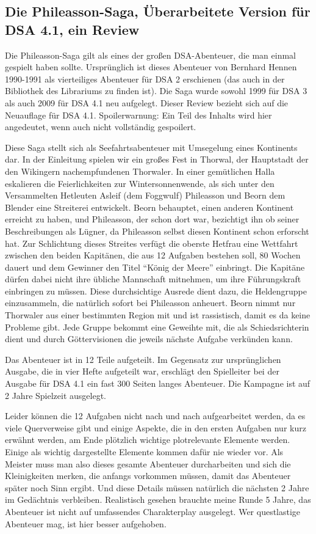 \documentclass[final]{multiversum}
\begin{document}
\makemultititle
%

\subsection{Die Phileasson-Saga, Überarbeitete Version für DSA 4.1, ein Review}
Die Phileasson-Saga gilt als eines der großen DSA-Abenteuer, die man einmal
gespielt haben sollte. Ursprünglich ist dieses Abenteuer von Bernhard Hennen
1990-1991 als vierteiliges Abenteuer für DSA 2 erschienen (das auch in der
Bibliothek des Librariums zu finden ist). Die Saga wurde sowohl 1999 für DSA 3
als auch 2009 für DSA 4.1 neu aufgelegt. Dieser Review bezieht sich auf die
Neuauflage für DSA 4.1. Spoilerwarnung: Ein Teil des Inhalts wird hier
angedeutet, wenn auch nicht vollständig gespoilert.

Diese Saga stellt sich als Seefahrtsabenteuer mit Umsegelung eines Kontinents
dar. In der Einleitung spielen wir ein großes Fest in Thorwal, der Hauptstadt
der den Wikingern nachempfundenen Thorwaler. In einer gemütlichen Halla
eskalieren die Feierlichkeiten zur Wintersonnenwende, als sich unter den
Versammelten Hetleuten Asleif (dem Foggwulf) Phileasson und Beorn dem Blender
eine Streiterei entwickelt. Beorn behauptet, einen anderen Kontinent erreicht zu
haben, und Phileasson, der schon dort war, bezichtigt ihn ob seiner
Beschreibungen als Lügner, da Phileasson selbst diesen Kontinent schon erforscht
hat. Zur Schlichtung dieses Streites verfügt die oberste Hetfrau eine Wettfahrt
zwischen den beiden Kapitänen, die aus 12 Aufgaben bestehen soll, 80 Wochen
dauert und dem Gewinner den Titel “König der Meere” einbringt. Die Kapitäne
dürfen dabei nicht ihre übliche Mannschaft mitnehmen, um ihre Führungskraft
einbringen zu müssen. Diese durchsichtige Ausrede dient dazu, die Heldengruppe
einzusammeln, die natürlich sofort bei Phileasson anheuert. Beorn nimmt nur
Thorwaler aus einer bestimmten Region mit und ist rassistisch, damit es da keine
Probleme gibt. Jede Gruppe bekommt eine Geweihte mit, die als Schiedsrichterin
dient und durch Göttervisionen die jeweils nächste Aufgabe verkünden kann.

Das Abenteuer ist in 12 Teile aufgeteilt. Im Gegensatz zur ursprünglichen
Ausgabe, die in vier Hefte aufgeteilt war, erschlägt den Spielleiter bei der
Ausgabe für DSA 4.1 ein fast 300 Seiten langes Abenteuer. Die Kampagne ist auf 2
Jahre Spielzeit ausgelegt.

Leider können die 12 Aufgaben nicht nach und nach aufgearbeitet werden, da es
viele Querverweise gibt und einige Aspekte, die in den ersten Aufgaben nur kurz
erwähnt werden, am Ende plötzlich wichtige plotrelevante Elemente werden. Einige
als wichtig dargestellte Elemente kommen dafür nie wieder vor. Als Meister muss
man also dieses gesamte Abenteuer durcharbeiten und sich die Kleinigkeiten
merken, die anfangs vorkommen müssen, damit das Abenteuer später noch Sinn
ergibt. Und diese Details müssen natürlich die nächsten 2 Jahre im Gedächtnis
verbleiben. Realistisch gesehen brauchte meine Runde 5 Jahre, das Abenteuer ist
nicht auf umfassendes Charakterplay ausgelegt. Wer questlastige Abenteuer mag,
ist hier besser aufgehoben.
\end{document}
